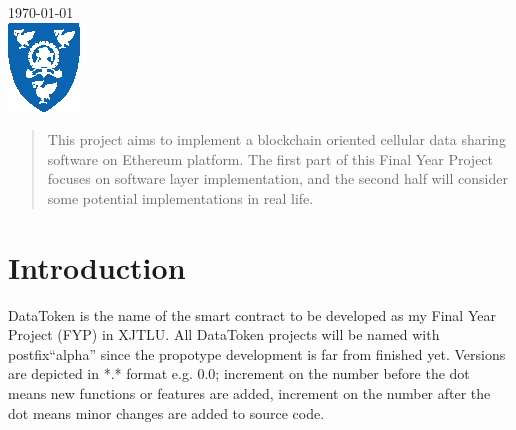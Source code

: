 \begin{titlepage}

{\large \today}\\[1.5cm] %


\includegraphics[width=0.33\linewidth]{XJTLU_shield.eps}\\[0.3cm] %
 

\vfill %

\end{titlepage}
\tableofcontents

\begin{abstract}
This project aims to implement a blockchain oriented cellular 
data sharing software on Ethereum platform. The first part of this
Final Year Project focuses on software layer implementation, and the
second half will consider some potential implementations in real life.

\end{abstract}

\section{Introduction}
DataToken is the name of the smart contract to be developed as my Final Year Project (FYP) in XJTLU.
All DataToken projects will be named with postfix``alpha'' since the propotype development is far from 
finished yet.
Versions are depicted in *.* format e.g. 0.0; increment on the number before the dot means 
new functions or features are added, increment on the number after the dot means minor 
changes are added to source code.

